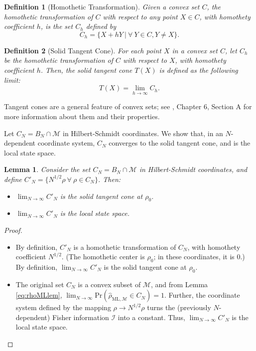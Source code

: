 \documentclass[aps,pra, twocolumn]{revtex4-1}
\newcommand{\M}{\mathcal{M}}
\newcommand{\rhohat}{\hat{\rho}}
\newcommand{\rhoML}[1]{\rhohat_{\scriptscriptstyle{\mathrm{ML},#1}}}
\newtheorem{lem}{Lemma}
\newtheorem{mydef}{Definition}
\begin{document}
\begin{mydef}[Homothetic Transformation] Given a convex set $C$, the homothetic transformation of $C$ with respect to any point $X \in C$, with homothety coefficient $h$, is the set $C_{h}$ defined by
\[C_{h} = \{X + hY~|~\forall~Y\in C, Y \neq X\}.\]
\end{mydef}

\begin{mydef}[Solid Tangent Cone] For each point $X$ in a convex set $C$, let $C_{h}$ be the homothetic transformation of $C$ with respect to $X$, with homothety coefficient $h$. Then, the solid tangent cone $T(X)$ is defined as the following limit:
\[T(X) = \lim_{h\rightarrow \infty} C_{h}.\]
\end{mydef}

Tangent cones are a general feature of convex sets; see \cite{Rockafellar1998}, Chapter 6, Section A for more information about them and their properties.

Let $C_{N} = B_{N} \cap \M$ in Hilbert-Schmidt coordinates. 
We show that, in an $N$-dependent coordinate system, $C_{N}$ converges to the solid tangent cone, and is the local state space.

\begin{lem}Consider the set $C_{N} = B_{N} \cap \M$ in Hilbert-Schmidt coordinates, and define $C'_{N} = \{N^{1/2}\rho~\forall~\rho \in C_{N}\}$. Then:
\begin{itemize}
\item [1)] $\lim_{N\rightarrow \infty}C'_{N}$ is the solid tangent cone at $\rho_{0}$.
\item [2)] $\lim_{N\rightarrow \infty}C'_{N}$ is the local state space.
\end{itemize}
\end{lem}
\begin{proof}~\\
\begin{itemize}
\item [1)] By definition, $C'_{N}$ is a homothetic transformation of $C_{N}$, with homothety coefficient $N^{1/2}$. (The homothetic center is $\rho_{0}$; in these coordinates, it is 0.) By definition, $\lim_{N\rightarrow \infty}C'_{N}$ is the solid tangent cone at $\rho_{0}$.
\item [2)] The original set $C_{N}$ is a convex subset of $\M$, and from Lemma \ref{eq:rhoMLlem}, $\lim_{N\rightarrow \infty}\mathrm{Pr}(\rhoML{\M} \in C_{N}) = 1$.  Further, the coordinate system defined by the mapping $\rho \rightarrow N^{1/2}\rho$ turns the (previously $N$-dependent) Fisher information $\mathcal{I}$ into a constant. Thus, $\lim_{N\rightarrow \infty}C'_{N}$ is the local state space.
\end{itemize}
\end{proof}
\end{document}

